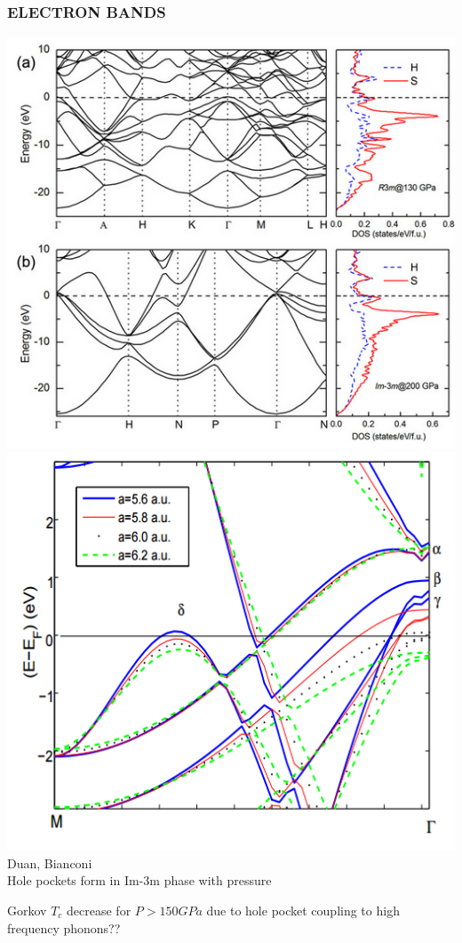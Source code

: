\documentclass[amssymb,amsmath]{beamer}
\begin{document}
\begin{frame}
\frametitle{ELECTRON BANDS}
\includegraphics[scale=0.29]{./figures/electrons_duan.png}
\includegraphics[scale=0.29]{./figures/electrons_bianconi.png}\\
\centering Duan, Bianconi\\[0.2cm]
Hole pockets form in Im-3m phase with pressure \\
\begin{block}{Gorkov}
$T_c$ decrease for $P>150GPa$ due to hole pocket coupling to high frequency phonons??
\end{block}

\end{frame}
\end{document}
